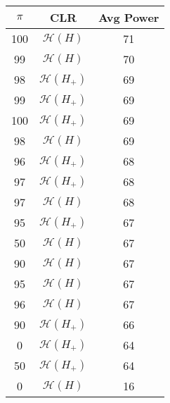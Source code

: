 \centering \begin{tabular}{c|c|c}
$\pi$	&CLR	&Avg Power\\\hline
100	&$\mathcal{H}(H)$	&71\\
99	&$\mathcal{H}(H)$	&70\\
98	&$\mathcal{H}(H_+)$	&69\\
99	&$\mathcal{H}(H_+)$	&69\\
100	&$\mathcal{H}(H_+)$	&69\\
98	&$\mathcal{H}(H)$	&69\\
96	&$\mathcal{H}(H_+)$	&68\\
97	&$\mathcal{H}(H_+)$	&68\\
97	&$\mathcal{H}(H)$	&68\\
95	&$\mathcal{H}(H_+)$	&67\\
50	&$\mathcal{H}(H)$	&67\\
90	&$\mathcal{H}(H)$	&67\\
95	&$\mathcal{H}(H)$	&67\\
96	&$\mathcal{H}(H)$	&67\\
90	&$\mathcal{H}(H_+)$	&66\\
0	&$\mathcal{H}(H_+)$	&64\\
50	&$\mathcal{H}(H_+)$	&64\\
0	&$\mathcal{H}(H)$	&16\\
\end{tabular}
